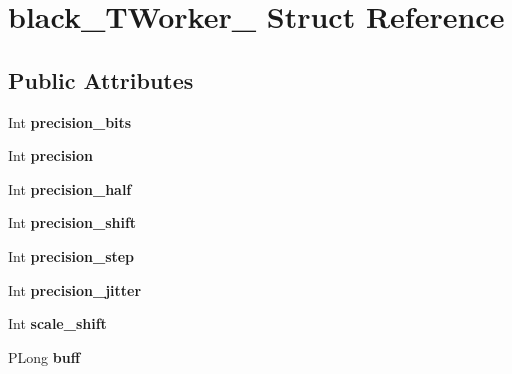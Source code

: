 \hypertarget{structblack___t_worker__}{}\section{black\+\_\+\+T\+Worker\+\_\+ Struct Reference}
\label{structblack___t_worker__}
\subsection*{Public Attributes}
\begin{DoxyCompactItemize}
\item 
\mbox{\label{structblack___t_worker___a107b2f825d657c132b073a3db7a78d31}} 
Int {\bfseries precision\+\_\+bits}
\item 
\mbox{\label{structblack___t_worker___a3ff084dc7318c617a0dfc3eb84cdf2a8}} 
Int {\bfseries precision}
\item 
\mbox{\label{structblack___t_worker___af9803d7235c791c7da80bf8a52cfcc4e}} 
Int {\bfseries precision\+\_\+half}
\item 
\mbox{\label{structblack___t_worker___af1469894851017f2ee98024cd2c532a4}} 
Int {\bfseries precision\+\_\+shift}
\item 
\mbox{\label{structblack___t_worker___ab94a80c4ccbe225761301b68b35dceaf}} 
Int {\bfseries precision\+\_\+step}
\item 
\mbox{\label{structblack___t_worker___a6e9e353bf856971c1df9c2ae8fb0e74b}} 
Int {\bfseries precision\+\_\+jitter}
\item 
\mbox{\label{structblack___t_worker___a02c8558b46acbb13229d0dc4a5cc6111}} 
Int {\bfseries scale\+\_\+shift}
\item 
\mbox{\label{structblack___t_worker___ab1369079407528eddbb0a835d34c8e8a}} 
P\+Long {\bfseries buff}
\item 
\mbox{\label{structblack___t_worker___ae85371224bd8ec68e3efb685fbf5bb1e}} 

\end{DoxyCompactItemize}
